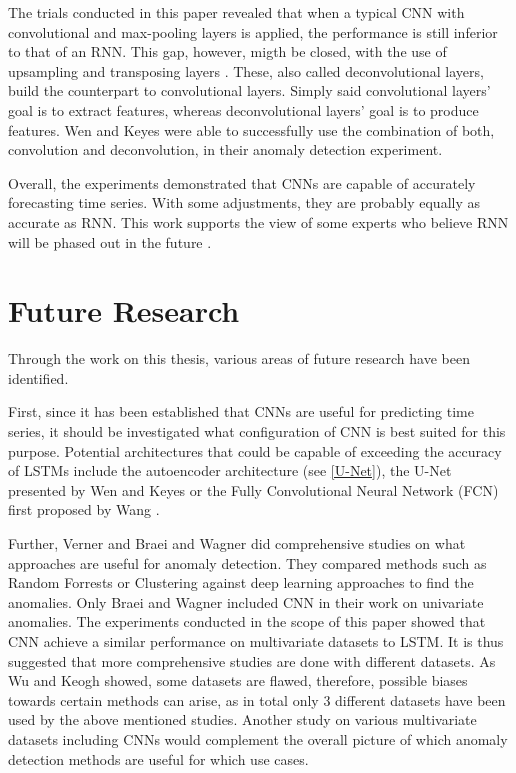 The trials conducted in this paper revealed that when a typical CNN with convolutional and max-pooling layers is applied, the performance is still inferior to that of an RNN. This gap, however, migth be closed, with the use of upsampling and transposing layers \parencite{Wen2019}. These, also called deconvolutional layers, build the counterpart to convolutional layers. Simply said convolutional layers' goal is to extract features, whereas deconvolutional layers' goal is to produce features. Wen and Keyes \parencite*{Wen2019} were able to successfully use the combination of both, convolution and deconvolution, in their anomaly detection experiment.

Overall, the experiments demonstrated that CNNs are capable of accurately forecasting time series. With some adjustments, they are probably equally as accurate as RNN. This work supports the view of some experts who believe RNN will be phased out in the future \parencite{Culurciello2018} \parencite{Bai2018}. 

\clearpage
\section{Future Research}
Through the work on this thesis, various areas of future research have been identified.

First, since it has been established that CNNs are useful for predicting time series, it should be investigated what configuration of CNN is best suited for this purpose. Potential architectures that could be capable of exceeding the accuracy of LSTMs include the autoencoder architecture (see \ref{U-Net}), the U-Net presented by Wen and Keyes \parencite*{Wen2019} or the Fully Convolutional Neural Network (FCN) first proposed by Wang \parencite*{Wang2017}.

Further, Verner \parencite*{Verner2019} and Braei and Wagner \parencite*{Braei2020} did comprehensive studies on what approaches are useful for anomaly detection. They compared methods such as Random Forrests or Clustering against deep learning approaches to find the anomalies. Only Braei and Wagner \parencite*{Braei2020} included CNN in their work on univariate anomalies. The experiments conducted in the scope of this paper showed that CNN achieve a similar performance on multivariate datasets to LSTM. It is thus suggested that more comprehensive studies are done with different datasets. As Wu and Keogh \parencite*{Wu2020} showed, some datasets are flawed, therefore, possible biases towards certain methods can arise, as in total only 3 different datasets have been used by the above mentioned studies. Another study on various multivariate datasets including CNNs would complement the overall picture of which anomaly detection methods are useful for which use cases.







